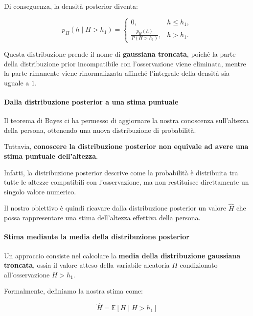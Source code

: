 Di conseguenza, la densità posterior diventa:

\begin{equation*}
    \boxed{
    p_H(h \mid H>h_1)
    =
    \begin{cases}
        0, & h \leq h_1,\\[6pt]
        \displaystyle\frac{p_H(h)}{P(H>h_1)}, & h>h_1.
    \end{cases}
    }
\end{equation*}

Questa distribuzione prende il nome di \textbf{gaussiana troncata}, poiché la parte della distribuzione prior incompatibile con l'osservazione viene eliminata, mentre la parte rimanente viene rinormalizzata affinché l'integrale della densità sia uguale a $1$.

\paragraph{Dalla distribuzione posterior a una stima puntuale}

Il teorema di Bayes ci ha permesso di aggiornare la nostra conoscenza sull'altezza della persona, ottenendo una nuova distribuzione di probabilità.

Tuttavia, \textbf{conoscere la distribuzione posterior non equivale ad avere una stima puntuale dell'altezza}.

Infatti, la distribuzione posterior descrive come la probabilità è distribuita tra tutte le altezze compatibili con l'osservazione, ma non restituisce direttamente un singolo valore numerico.

Il nostro obiettivo è quindi ricavare dalla distribuzione posterior un valore $\hat{H}$ che possa rappresentare una stima dell'altezza effettiva della persona.

\paragraph{Stima mediante la media della distribuzione posterior}

Un approccio consiste nel calcolare la \textbf{media della distribuzione gaussiana troncata}, ossia il valore atteso della variabile aleatoria $H$ condizionato all'osservazione $H>h_1$.

Formalmente, definiamo la nostra stima come:

\begin{equation*}
    \boxed{
    \hat{H}
    =
    \mathbb{E}[H\mid H>h_1]
    }
\end{equation*}

